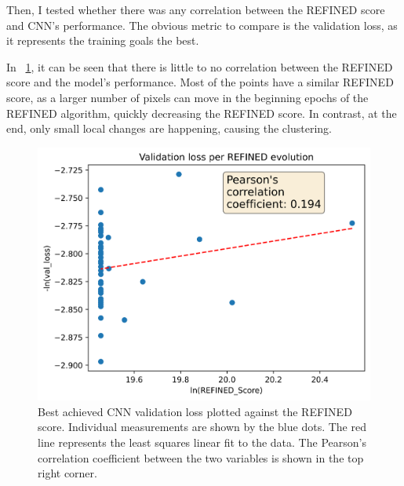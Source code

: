 Then, I tested whether there was any correlation between the REFINED score and CNN's performance. The obvious metric to compare is the validation loss, as it represents the training goals the best.

In ~\ref{fig:REFINED_progression}, it can be seen that there is little to no correlation between the REFINED score and the model's performance. Most of the points have a similar REFINED score, as a larger number of pixels can move in the beginning epochs of the REFINED algorithm, quickly decreasing the REFINED score. In contrast, at the end, only small local changes are happening, causing the clustering.

\begin{figure}
    \centering
    \includegraphics[width=0.75\linewidth]{progression.png}
    \caption{Best achieved CNN validation loss plotted against the REFINED score. Individual measurements are shown by the blue dots. The red line represents the least squares linear fit to the data. The Pearson's correlation coefficient between the two variables is shown in the top right corner.}
    \label{fig:REFINED_progression}
\end{figure}

